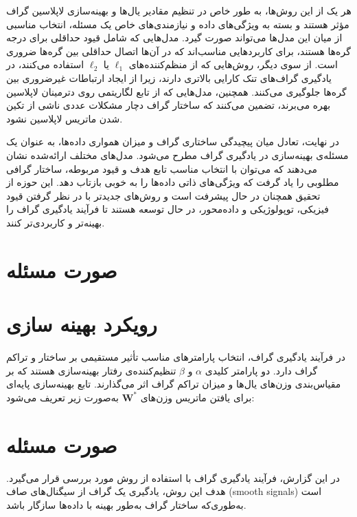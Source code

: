 \documentclass[10pt,twocolumn,a4paper]{article}
\begin{document}
     هر یک از این روش‌ها، به طور خاص در تنظیم مقادیر یال‌ها و بهینه‌سازی لاپلاسین گراف مؤثر هستند و بسته به ویژگی‌های داده و نیازمندی‌های خاص یک مسئله، انتخاب مناسبی از میان این مدل‌ها می‌تواند صورت گیرد. مدل‌هایی که شامل قیود حداقلی برای درجه گره‌ها هستند، برای کاربردهایی مناسب‌اند که در آن‌ها اتصال حداقلی بین گره‌ها ضروری است. از سوی دیگر، روش‌هایی که از منظم‌کننده‌های \(\ell_1\) یا \(\ell_2\) استفاده می‌کنند، در یادگیری گراف‌های تنک کارایی بالاتری دارند، زیرا از ایجاد ارتباطات غیرضروری بین گره‌ها جلوگیری می‌کنند. همچنین، مدل‌هایی که از تابع لگاریتمی روی دترمینان لاپلاسین بهره می‌برند، تضمین می‌کنند که ساختار گراف دچار مشکلات عددی ناشی از تکین شدن ماتریس لاپلاسین نشود.
     
     در نهایت، تعادل میان پیچیدگی ساختاری گراف و میزان همواری داده‌ها، به عنوان یک مسئله‌ی بهینه‌سازی در یادگیری گراف مطرح می‌شود. مدل‌های مختلف ارائه‌شده نشان می‌دهند که می‌توان با انتخاب مناسب تابع هدف و قیود مربوطه، ساختار گرافی مطلوبی را یاد گرفت که ویژگی‌های ذاتی داده‌ها را به خوبی بازتاب دهد. این حوزه از تحقیق همچنان در حال پیشرفت است و روش‌های جدیدتر با در نظر گرفتن قیود فیزیکی، توپولوژیکی و داده‌محور، در حال توسعه هستند تا فرآیند یادگیری گراف را بهینه‌تر و کاربردی‌تر کنند.
     
     
      \section{صورت مسئله}
     
     
     

	\section{رویکرد بهینه سازی}
      در فرآیند یادگیری گراف، انتخاب پارامترهای مناسب تأثیر مستقیمی بر ساختار و تراکم گراف دارد. دو پارامتر کلیدی \( \alpha \) و \( \beta \) تنظیم‌کننده‌ی رفتار بهینه‌سازی هستند که بر مقیاس‌بندی وزن‌های یال‌ها و میزان تراکم گراف اثر می‌گذارند. تابع بهینه‌سازی پایه‌ای برای یافتن ماتریس وزن‌های \( \bm{W}^* \) به‌صورت زیر تعریف می‌شود:
      
    \section{صورت مسئله}
    
    	در این گزارش، فرآیند یادگیری گراف با استفاده از روش \cite{Kalofolias2016} مورد بررسی قرار می‌گیرد. هدف این روش، یادگیری یک گراف از سیگنال‌های صاف (smooth signals) است به‌طوری‌که ساختار گراف به‌طور بهینه با داده‌ها سازگار باشد.
\end{document}

